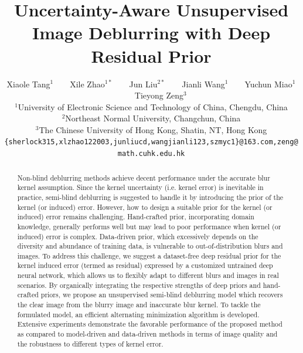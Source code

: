 \documentclass[10pt,twocolumn,letterpaper]{article}
\begin{document}
	
	\title{Uncertainty-Aware Unsupervised  Image Deblurring with Deep Residual Prior}
	
	\author{Xiaole Tang$^1$~~~~Xile Zhao$^{1*}$~~~~Jun Liu$^{2*}$~~~~Jianli Wang$^1$~~~~Yuchun Miao$^1$~~~~ Tieyong Zeng$^3$\\
		$^1$University of Electronic Science and Technology of China, Chengdu, China\\
		$^2$Northeast Normal University, Changchun, China\\
		$^3$The Chinese University of Hong Kong, Shatin, NT, Hong Kong\\
		{\tt\small \{sherlock315,xlzhao122003,junliucd,wangjianli123,szmyc1\}@163.com,zeng@math.cuhk.edu.hk}
	}
	\maketitle
	
	\begin{abstract}
		Non-blind deblurring methods achieve decent performance under the accurate blur kernel assumption. Since the kernel uncertainty (i.e. kernel error) is inevitable in practice, semi-blind deblurring is suggested to handle it by introducing the prior of the kernel (or induced) error. However, how to design a suitable prior for the kernel (or induced) error remains challenging. Hand-crafted prior, incorporating domain knowledge, generally performs well but may lead to poor performance when kernel (or induced) error is complex. Data-driven prior, which excessively depends on the diversity and abundance of training data, is vulnerable to out-of-distribution blurs and images. To address this challenge, we suggest a dataset-free deep residual prior for the kernel induced error (termed as residual) expressed by a customized untrained deep neural network, which allows us to flexibly adapt to different blurs and images in real scenarios. By organically integrating the respective strengths of deep priors and hand-crafted priors, we propose an unsupervised semi-blind deblurring model which recovers the clear image from the blurry image and inaccurate blur kernel. To tackle the formulated model, an efficient alternating minimization algorithm is developed. Extensive experiments demonstrate the favorable performance of the proposed method as compared to model-driven and data-driven methods in terms of image quality and the robustness to different types of kernel error. 
	\end{abstract}
\end{document}
